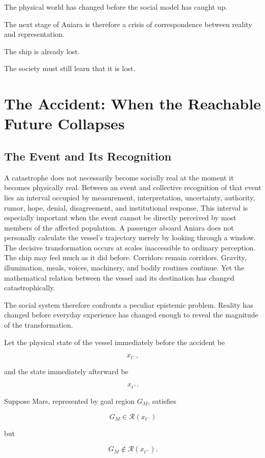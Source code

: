 \documentclass[11pt,oneside]{book}
\theoremstyle{definition}
\theoremstyle{remark}
\newcommand{\R}{\mathcal{R}}
\begin{document}
The physical world has changed before the social model has caught up.

The next stage of Aniara is therefore a crisis of correspondence between reality and representation.

The ship is already lost.

The society must still learn that it is lost.

\chapter{The Accident: When the Reachable Future Collapses}

\section{The Event and Its Recognition}

A catastrophe does not necessarily become socially real at the moment it becomes physically real. Between an event and collective recognition of that event lies an interval occupied by measurement, interpretation, uncertainty, authority, rumor, hope, denial, disagreement, and institutional response. This interval is especially important when the event cannot be directly perceived by most members of the affected population. A passenger aboard Aniara does not personally calculate the vessel's trajectory merely by looking through a window. The decisive transformation occurs at scales inaccessible to ordinary perception. The ship may feel much as it did before. Corridors remain corridors. Gravity, illumination, meals, voices, machinery, and bodily routines continue. Yet the mathematical relation between the vessel and its destination has changed catastrophically.

The social system therefore confronts a peculiar epistemic problem. Reality has changed before everyday experience has changed enough to reveal the magnitude of the transformation.

Let the physical state of the vessel immediately before the accident be

\[
x_{t^-},
\]

and the state immediately afterward be

\[
x_{t^+}.
\]

Suppose Mars, represented by goal region \(G_M\), satisfies

\[
G_M\in\R(x_{t^-})
\]

but

\[
G_M\notin\R(x_{t^+}).
\]
\end{document}
